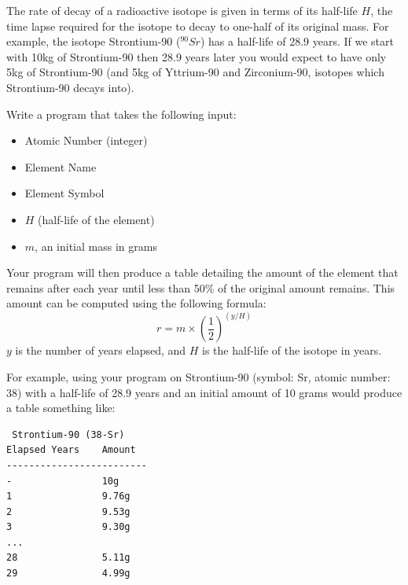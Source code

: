 \begin{exer}
The rate of decay of a radioactive
isotope is given in terms of its half-life $H$, the time lapse required
for the isotope to decay to one-half of its original mass. For example,
the isotope Strontium-90 ($^{90}Sr$) has a half-life of 28.9 years.  If
we start with 10kg of Strontium-90 then 28.9 years later you 
would expect to have only 5kg of Strontium-90 (and 5kg
of Yttrium-90 and Zirconium-90, isotopes which Strontium-90 decays
into).

Write a program that takes the following input:
\begin{itemize}
  \item Atomic Number (integer)
  \item Element Name
  \item Element Symbol
  \item $H$ (half-life of the element)
  \item $m$, an initial mass in grams
\end{itemize}

Your program will then produce a table detailing the amount of the element
that remains after each year until less than 50\% of the original amount remains.
This amount can be computed using the following formula:
  $$r = m \times \left(\frac{1}{2}\right)^{(y/H)}$$
$y$ is the number of years
elapsed, and $H$ is the half-life of the isotope in years.

For example, using your program on Strontium-90 (symbol: Sr, atomic number: 38)
with a half-life of 28.9 years and an initial amount of 10 grams would produce a table something like:
\begin{verbatim}
 Strontium-90 (38-Sr)
Elapsed Years    Amount
-------------------------
-                10g
1                9.76g
2                9.53g
3                9.30g
...
28               5.11g
29               4.99g
\end{verbatim}
\end{exer}

